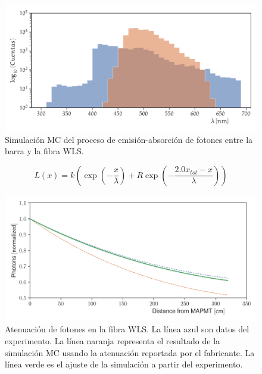 \begin{figure}
        \centering
        \includegraphics[width=\textwidth]{sim-optics-spect.pdf}
        \caption{Simulación MC del proceso de emisión-absorción de fotones entre la barra y la fibra WLS.}
        \label{fig:sim-optics}
\end{figure}

\begin{equation}
\label{equ:fiber-attributed}
L(x)=k\left(\exp\left(-\frac{x}{\lambda}\right) +R\exp\left(-\frac{2.0x_{tot}-x}{\lambda}\right)\right)
\end{equation}

\begin{figure}
        \centering
        \includegraphics[width=\textwidth]{data_atlength.pdf}
        \caption{Atenuación de fotones en la fibra WLS. La línea azul son datos del experimento. La línea naranja representa el resultado de la simulación MC usando la atenuación reportada por el fabricante. La línea verde es el ajuste de la simulación a partir del experimento.}
        \label{fig:atlength}
\end{figure}

